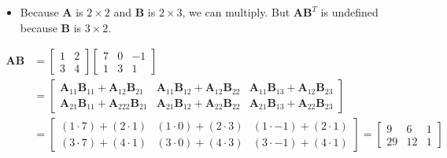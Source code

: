 \begin{itemize}
        \begin{itemize}
            \item Because $\bm{A}$ is $2 \times 2$ and $\bm{B}$ is $2 \times 3$, we can multiply. But $\bm{A}\bm{B}^T$ is undefined because $\bm{B}$ is $3 \times 2$. 
        \end{itemize}
        \begin{align*}
            \bm{AB} & =
            \begin{bmatrix}
                1 & 2 \\
                3 & 4
            \end{bmatrix}
            \begin{bmatrix}
                7 & 0 & -1\\
                1 & 3 & 1
            \end{bmatrix} \\
            & = 
            \begin{bmatrix}
                \bm{A}_{11}\bm{B}_{11} + \bm{A}_{12}\bm{B}_{21} & 
                \bm{A}_{11}\bm{B}_{12} + \bm{A}_{12}\bm{B}_{22} &
                \bm{A}_{11}\bm{B}_{13} + \bm{A}_{12}\bm{B}_{23} \\ 
                \bm{A}_{21}\bm{B}_{11} + \bm{A}_{222}\bm{B}_{21} & 
                \bm{A}_{21}\bm{B}_{12} + \bm{A}_{22}\bm{B}_{22} &
                \bm{A}_{21}\bm{B}_{13} + \bm{A}_{22}\bm{B}_{23}
            \end{bmatrix} \\
            & =
            \begin{bmatrix}
                (1 \cdot 7) + (2 \cdot 1) & 
                (1 \cdot 0) + (2 \cdot 3) &
                (1 \cdot -1) + (2 \cdot 1) \\ 
                (3 \cdot 7) + (4 \cdot 1) &
                (3 \cdot 0) + (4 \cdot 3) & 
                (3 \cdot -1) + (4 \cdot 1) 
            \end{bmatrix} 
            = 
            \begin{bmatrix}
                9 & 6 & 1 \\
                29 & 12 & 1
            \end{bmatrix}
        \end{align*}


\end{itemize}

